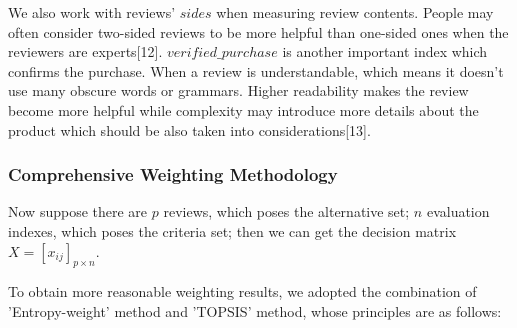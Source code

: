 \documentclass{mcmthesis}
\begin{document}
We also work with reviews' $sides$ when measuring review contents. People may often consider two-sided reviews to be more helpful than one-sided ones when the reviewers are experts[12].
$verified\_purchase$ is another important index which confirms the purchase. When a review is understandable, which means it doesn't use many obscure words or grammars. Higher readability makes the review become more helpful while complexity may introduce more details about the product which should be also taken into considerations[13].

\subsubsection{Comprehensive Weighting Methodology}
\quad \quad Now suppose there are $p$ reviews, which poses the alternative set; $n$ evaluation indexes, which poses the criteria set; then we can get the decision matrix $X=[x_{ij}]_{p\times n}$.

To obtain more reasonable weighting results, we adopted the combination of 'Entropy-weight' method and 'TOPSIS' method, whose principles are as follows:
\end{document}
